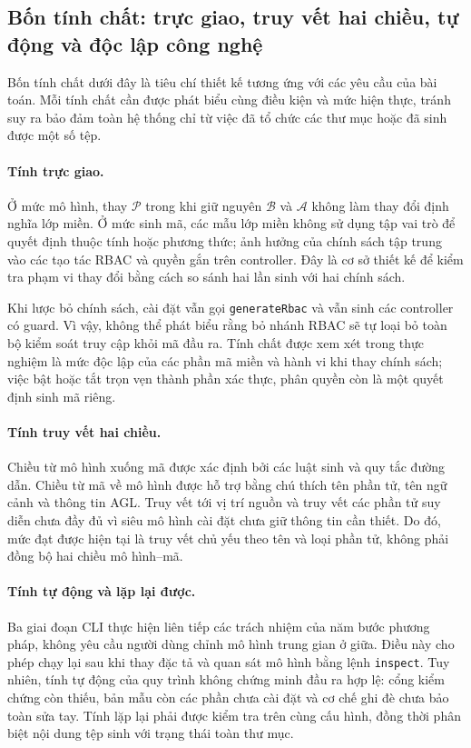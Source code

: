 \subsection{Bốn tính chất: trực giao, truy vết hai chiều, tự động và độc lập công nghệ}
\label{sec:tinh-chat}

Bốn tính chất dưới đây là tiêu chí thiết kế tương ứng với các yêu cầu của bài toán. Mỗi tính chất cần được phát biểu cùng điều kiện và mức hiện thực, tránh suy ra bảo đảm toàn hệ thống chỉ từ việc đã tổ chức các thư mục hoặc đã sinh được một số tệp.

\paragraph{Tính trực giao.}
Ở mức mô hình, thay $\mathcal{P}$ trong khi giữ nguyên $\mathcal{B}$ và $\mathcal{A}$ không làm thay đổi định nghĩa lớp miền. Ở mức sinh mã, các mẫu lớp miền không sử dụng tập vai trò để quyết định thuộc tính hoặc phương thức; ảnh hưởng của chính sách tập trung vào các tạo tác RBAC và quyền gắn trên controller. Đây là cơ sở thiết kế để kiểm tra phạm vi thay đổi bằng cách so sánh hai lần sinh với hai chính sách.

Khi lược bỏ chính sách, cài đặt vẫn gọi \texttt{generateRbac} và vẫn sinh các controller có guard. Vì vậy, không thể phát biểu rằng bỏ nhánh RBAC sẽ tự loại bỏ toàn bộ kiểm soát truy cập khỏi mã đầu ra. Tính chất được xem xét trong thực nghiệm là mức độc lập của các phần mã miền và hành vi khi thay chính sách; việc bật hoặc tắt trọn vẹn thành phần xác thực, phân quyền còn là một quyết định sinh mã riêng.

\paragraph{Tính truy vết hai chiều.}
Chiều từ mô hình xuống mã được xác định bởi các luật sinh và quy tắc đường dẫn. Chiều từ mã về mô hình được hỗ trợ bằng chú thích tên phần tử, tên ngữ cảnh và thông tin AGL. Truy vết tới vị trí nguồn và truy vết các phần tử suy diễn chưa đầy đủ vì siêu mô hình cài đặt chưa giữ thông tin cần thiết. Do đó, mức đạt được hiện tại là truy vết chủ yếu theo tên và loại phần tử, không phải đồng bộ hai chiều mô hình--mã.

\paragraph{Tính tự động và lặp lại được.}
Ba giai đoạn CLI thực hiện liên tiếp các trách nhiệm của năm bước phương pháp, không yêu cầu người dùng chỉnh mô hình trung gian ở giữa. Điều này cho phép chạy lại sau khi thay đặc tả và quan sát mô hình bằng lệnh \texttt{inspect}. Tuy nhiên, tính tự động của quy trình không chứng minh đầu ra hợp lệ: cổng kiểm chứng còn thiếu, bản mẫu còn các phần chưa cài đặt và cơ chế ghi đè chưa bảo toàn sửa tay. Tính lặp lại phải được kiểm tra trên cùng cấu hình, đồng thời phân biệt nội dung tệp sinh với trạng thái toàn thư mục.

